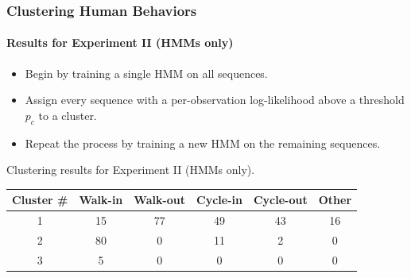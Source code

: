 
\begin{frame}
    \frametitle{Clustering Human Behaviors}
    \framesubtitle{Results for Experiment II (HMMs only)}

    \begin{itemize}
        \item Begin by training a single HMM on all sequences.
        \item Assign every sequence with a per-observation log-likelihood 
            above a threshold $p_c$ to a cluster.
        \item Repeat the process by training a new HMM on the 
            remaining sequences.
    \end{itemize}

    \medskip

    \centering Clustering results for Experiment II (HMMs only).

    \begin{table}
        \label{tab:hmm-assoc-matrix}
        \vspace{-0.1in}
        \centering
        \begin{tabular}{ | c | c | c | c | c | c | }
            \hline
            Cluster \# & Walk-in & Walk-out & Cycle-in & Cycle-out & Other \\ 
            \hline 
            1 & 15 & 77 & 49 & 43 & 16 \\ \hline
            2 & 80 & 0 & 11 & 2 & 0 \\ \hline   
            3 & 5 & 0 & 0 & 0 & 0 \\ \hline 
        \end{tabular}
    \end{table}

\end{frame}


